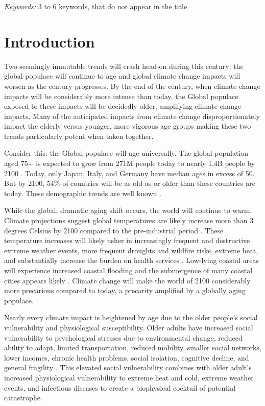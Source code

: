\documentclass[12pt]{article}
\begin{document}
\noindent%
{\it Keywords:} 3 to 6 keywords, that do not appear in the title
\vfill

\newpage
{} %

\hypertarget{introduction}{%
\section{Introduction}\label{introduction}}

Two seemingly immutable trends will crash head-on during this century:
the global populace will continue to age and global climate change
impacts will worsen as the century progresses. By the end of the
century, when climate change impacts will be considerably more intense
than today, the Global populace exposed to these impacts will be
decidedly older, amplifying climate change impacts. Many of the
anticipated impacts from climate change disproportionately impact the
elderly versus younger, more vigorous age groups making these two trends
particularly potent when taken together.

Consider this: the Global populace will age universally. The global
population aged 75+ is expected to grow from 271M people today to nearly
1.4B people by 2100 \citep{division_wpp2017}. Today, only Japan, Italy,
and Germany have median ages in excess of 50. But by 2100, 54\% of
countries will be as old as or older than these countries are today.
These demographic trends are well known
\citep{lutz2008coming, beard2016world}.

While the global, dramatic aging shift occurs, the world will continue
to warm. Climate projections suggest global temperatures are likely
increase more than 3 degrees Celsius by 2100 compared to the
pre-industrial period \citep{arias2021climate}. These temperature
increases will likely usher in increasingly frequent and destructive
extreme weather events, more frequent droughts and wildfire risks,
extreme heat, and substantially increase the burden on health services
\citep{portner2022climate}. Low-lying coastal areas will experience
increased coastal flooding and the submergence of many coastal cities
appears likely \citep{kulp2019new}. Climate change will make the world
of 2100 considerably more precarious compared to today, a precarity
amplified by a globally aging populace.

Nearly every climate impact is heightened by age due to the older
people's social vulnerability and physiological susceptibility. Older
adults have increased social vulnerability to psychological stresses due
to environmental change, reduced ability to adapt, limited
transportation, reduced mobility, smaller social networks, lower
incomes, chronic health problems, social isolation, cognitive decline,
and general fragility \citep{kovats2008heat}. This elevated social
vulnerability combines with older adult's increased physiological
vulnerability to extreme heat and cold, extreme weather events, and
infectious diseases to create a biophysical cocktail of potential
catastrophe.
\end{document}
